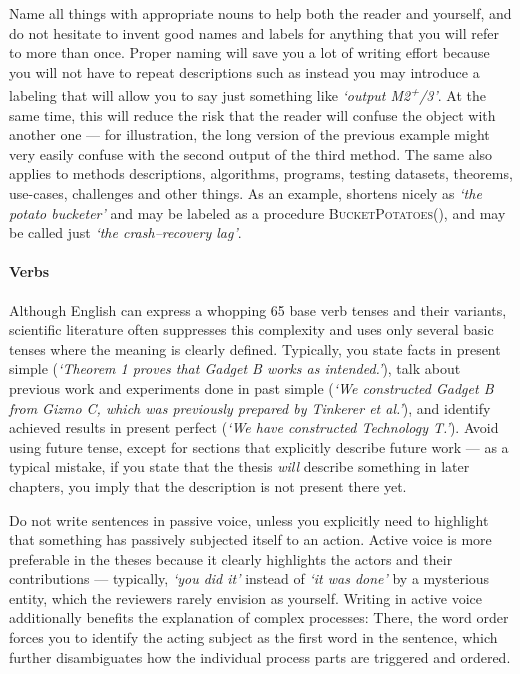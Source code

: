 Name all things with appropriate nouns to help both the reader and yourself, and do not hesitate to invent good names and labels for anything that you will refer to more than once. Proper naming will save you a lot of writing effort because you will not have to repeat descriptions such as  instead you may introduce a labeling that will allow you to say just something like \textit{`output M2\textsuperscript{+}/3'}. At the same time, this will reduce the risk that the reader will confuse the object with another one --- for illustration, the long version of the previous example might very easily confuse with the second output of the third method. The same also applies to methods descriptions, algorithms, programs, testing datasets, theorems, use-cases, challenges and other things. As an example,  shortens nicely as \textit{`the potato bucketer'} and may be labeled as a procedure \textsc{BucketPotatoes()}, and  may be called just \textit{`the crash--recovery lag'}.

\paragraph{Verbs}
Although English can express a whopping 65 base verb tenses and their variants, scientific literature often suppresses this complexity and uses only several basic tenses where the meaning is clearly defined. Typically, you state facts in present simple (\textit{`Theorem 1 proves that Gadget B works as intended.'}), talk about previous work and experiments done in past simple (\textit{`We constructed Gadget B from Gizmo C, which was previously prepared by Tinkerer et al.'}), and identify achieved results in present perfect (\textit{`We have constructed Technology T.'}). Avoid using future tense, except for sections that explicitly describe future work --- as a typical mistake, if you state that the thesis \emph{will} describe something in later chapters, you imply that the description is not present there yet.

Do not write sentences in passive voice, unless you explicitly need to highlight that something has passively subjected itself to an action. Active voice is more preferable in the theses because it clearly highlights the actors and their contributions --- typically, \textit{`you did it'} instead of \textit{`it was done'} by a mysterious entity, which the reviewers rarely envision as yourself. Writing in active voice additionally benefits the explanation of complex processes: There, the word order forces you to identify the acting subject as the first word in the sentence, which further disambiguates how the individual process parts are triggered and ordered.

